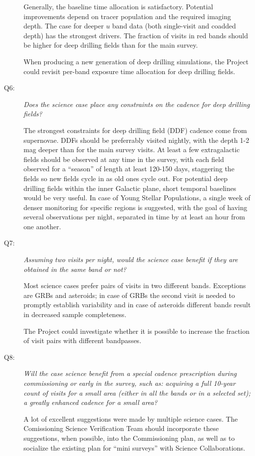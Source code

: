 \begin{description}
Generally, the baseline time allocation is satisfactory. Potential
improvements depend on tracer population and the required imaging depth.
The case for deeper $u$ band data (both single-visit and coadded depth)
has the strongest drivers. The fraction of visits in red bands should be
higher for deep drilling fields than for the main survey.

When producing a new generation of deep drilling simulations, the
Project could revisit per-band exposure time allocation for deep
drilling fields.


\item[Q6:] {\it Does the science case place any constraints on the
cadence for deep drilling fields?}

The strongest constraints for deep drilling field (DDF) cadence come
from supernovae. DDFs should be preferrably visited nightly, with the
depth 1-2 mag deeper than for the main survey visits. At least a few
extragalactic fields should be observed at any time in the survey, with
each field observed for a ``season'' of length at least 120-150 days,
staggering the fields so new fields cycle in as old ones cycle out. For
potential deep drilling fields within the inner Galactic plane, short
temporal baselines would be very useful. In case of Young Stellar
Populations, a single week of denser monitoring for specific regions is
suggested, with the goal of having several observations per night,
separated in time by at least an hour from one another.


\item[Q7:] {\it Assuming two visits per night, would the science case
benefit if they are obtained in the same band or not?}

Most science cases prefer pairs of visits in two different bands.
Exceptions are GRBs and asteroids; in case of GRBs the second visit is
needed to promptly establish variability and in case of asteroids
different bands result in decreased sample completeness.

The Project could investigate whether it is possible to increase the
fraction of visit pairs with different bandpasses.


\item[Q8:] {\it Will the case science benefit from a special cadence
prescription during commissioning or early in the survey, such as:
acquiring a full 10-year count of visits for a small area (either in all
the bands or in a  selected set); a greatly enhanced cadence for a small
area?}

A lot of excellent suggestions were made by multiple science cases.
The Comissioning Science Verification Team should incorporate these
suggestions, when possible, into the Commissioning plan, as well
as to socialize the existing plan for ``mini surveys'' with Science
Collaborations.



\end{description}
